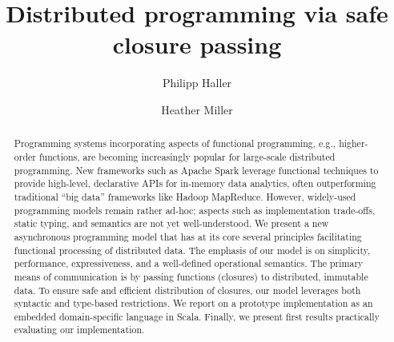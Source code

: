 \documentclass{easychair}
\begin{document}
\title{Distributed programming via safe closure passing}



%
\author{
  Philipp Haller
\and
  Heather Miller
}




\maketitle

\begin{abstract}

Programming systems incorporating aspects of functional programming, e.g.,
higher-order functions, are becoming increasingly popular for large-scale
distributed programming. New frameworks such as Apache Spark leverage
functional techniques to provide high-level, declarative APIs for in-memory
data analytics, often outperforming traditional ``big data'' frameworks like
Hadoop MapReduce. However, widely-used programming models remain rather
ad-hoc; aspects such as implementation trade-offs, static typing, and semantics
are not yet well-understood. We present a new asynchronous programming model
that has at its core several principles facilitating functional processing of
distributed data. The emphasis of our model is on simplicity, performance,
expressiveness, and a well-defined operational semantics. The primary means of
communication is by passing functions (closures) to distributed, immutable
data. To ensure safe and efficient distribution of closures, our model
leverages both syntactic and type-based restrictions. We report on a prototype
implementation as an embedded domain-specific language in Scala. Finally, we
present first results practically evaluating our implementation.

\end{abstract}
\end{document}
